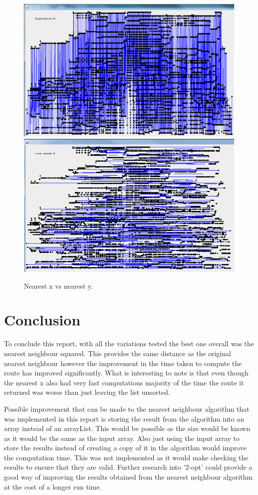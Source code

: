 \documentclass[conference,backref=page]{acmsiggraph}
\begin{document}
\begin{figure}[h]
		\includegraphics[width=\columnwidth]{images/rl5915nx.png}
			\includegraphics[width=\columnwidth]{images/rl5915ny.png}
	\caption{Nearest x vs nearest y.}
\end{figure}
\twocolumn
\section{Conclusion}

To conclude this report, with all the variations tested the best one overall was the nearest neighbour squared. This provides the same distance as the original nearest neighbour however the improvement in the time taken to compute the route has improved significantly. What is interesting to note is that even though the nearest x also had very fast computations majority of the time the route it returned was worse than just leaving the list unsorted. 

Possible improvement that can be made to the nearest neighbour algorithm that was implemented in this report is storing the result from the algorithm into an array instead of an arrayList. This would be possible as the size would be known as it would be the same as the input array. Also just using the input array to store the results instead of creating a copy of it in the algorithm would improve the computation time. This was not implemented as it would make checking the results to ensure that they are valid. Further research into '2-opt' could provide a good way of improving the results obtained from the nearest neighbour algorithm at the cost of a longer run time.
\end{document}
